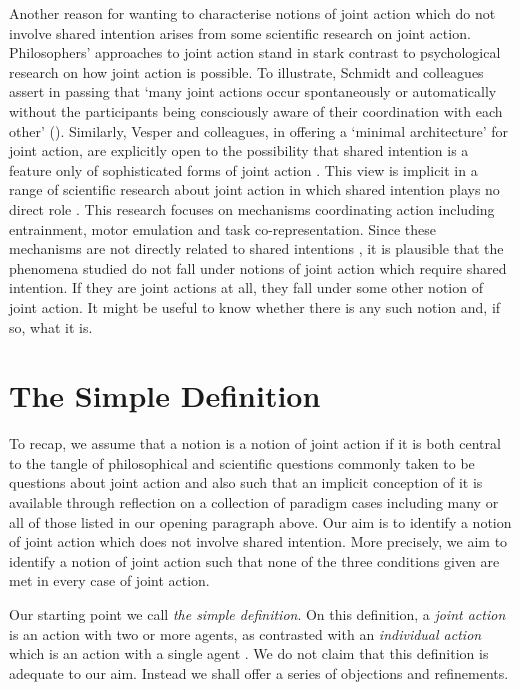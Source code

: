 \documentclass[12pt,a4paper]{extarticle}
\begin{document}
Another reason for wanting to characterise notions of joint action which do not involve shared intention arises from some  scientific research on joint action.
Philosophers' approaches to joint action stand in stark contrast to psychological research on how joint action is possible.
To illustrate, Schmidt and colleagues assert in passing that `many joint actions occur spontaneously or automatically without the participants being consciously aware of their coordination with each other' (\citeyear[p. 7]{schmidt_understanding_2010}).
Similarly, Vesper and colleagues, in offering a `minimal architecture' for joint action, are explicitly open to the possibility that shared intention is a feature only of sophisticated forms of joint action \citep{vesper_minimal_2010}.
This view is implicit in a range of scientific research about joint action in which shared intention plays no direct role 
	\citep[as reviewed in][]{%
		Knoblich:2010fk,
		Sebanz:2006yq%
	}.
This research focuses on mechanisms coordinating action including entrainment, motor emulation and task co-representation.  
Since these mechanisms are not directly related to shared intentions \citep{Knoblich:2008hy, vesper_minimal_2010},
it is plausible that the phenomena studied do not fall under notions of joint action which require shared intention.
If they are joint actions at all, they fall under some other notion of joint action.
It might be useful to know whether there is any such notion and, if so, what it is.


\section{The Simple Definition}
To recap, we assume that a notion is a notion of joint action if it is both central to the tangle of philosophical and scientific questions commonly taken to be questions about joint action and also such that an implicit conception of it is available through reflection on a collection of paradigm cases including many or all of those listed in our opening paragraph above. 
Our aim is to identify a notion of joint action which does not involve shared intention.
More precisely, we aim to identify a notion of joint action such that none of the three conditions given  are met in every case of joint action. 


Our starting point we call  \emph{the simple definition}.
On this definition, a \emph{joint action} is an action with two or more agents, as contrasted with an \emph{individual action} which is an action with a single agent \citep[p.\ 366]{ludwig_collective_2007}.
We do not claim that this definition is adequate to our aim.
Instead we shall offer a series of objections and refinements.
\end{document}
